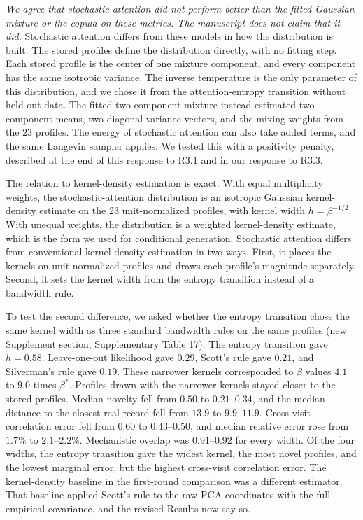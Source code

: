 \documentclass[
  11pt,
  letterpaper,
]{article}
\begin{document}
\emph{We agree that stochastic attention did not perform better than the
fitted Gaussian mixture or the copula on these metrics. The manuscript
does not claim that it did.} Stochastic attention differs from these
models in how the distribution is built. The stored profiles define the
distribution directly, with no fitting step. Each stored profile is the
center of one mixture component, and every component has the same
isotropic variance. The inverse temperature is the only parameter of
this distribution, and we chose it from the attention-entropy transition
without held-out data. The fitted two-component mixture instead
estimated two component means, two diagonal variance vectors, and the
mixing weights from the \(23\) profiles. The energy of stochastic
attention can also take added terms, and the same Langevin sampler
applies. We tested this with a positivity penalty, described at the end
of this response to R3.1 and in our response to R3.3.

The relation to kernel-density estimation is exact. With equal
multiplicity weights, the stochastic-attention distribution is an
isotropic Gaussian kernel-density estimate on the \(23\) unit-normalized
profiles, with kernel width \(h=\beta^{-1/2}\). With unequal weights,
the distribution is a weighted kernel-density estimate, which is the
form we used for conditional generation. Stochastic attention differs
from conventional kernel-density estimation in two ways. First, it
places the kernels on unit-normalized profiles and draws each profile's
magnitude separately. Second, it sets the kernel width from the entropy
transition instead of a bandwidth rule.

To test the second difference, we asked whether the entropy transition
chose the same kernel width as three standard bandwidth rules on the
same profiles (new Supplement section, Supplementary Table 17). The
entropy transition gave \(h=0.58\). Leave-one-out likelihood gave
\(0.29\), Scott's rule gave \(0.21\), and Silverman's rule gave
\(0.19\). These narrower kernels corresponded to \(\beta\) values
\(4.1\) to \(9.0\) times \(\beta^*\). Profiles drawn with the narrower
kernels stayed closer to the stored profiles. Median novelty fell from
\(0.50\) to \(0.21\)--\(0.34\), and the median distance to the closest
real record fell from \(13.9\) to \(9.9\)--\(11.9\). Cross-visit
correlation error fell from \(0.60\) to \(0.43\)--\(0.50\), and median
relative error rose from \(1.7\%\) to \(2.1\)--\(2.2\%\). Mechanistic
overlap was \(0.91\)--\(0.92\) for every width. Of the four widths, the
entropy transition gave the widest kernel, the most novel profiles, and
the lowest marginal error, but the highest cross-visit correlation
error. The kernel-density baseline in the first-round comparison was a
different estimator. That baseline applied Scott's rule to the raw PCA
coordinates with the full empirical covariance, and the revised Results
now say so.
\end{document}
